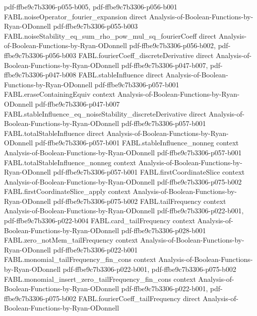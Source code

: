 \begin{theorem}
  {pdf-ffbe9c7b3306-p055-b005,
    pdf-ffbe9c7b3306-p056-b001}
\proofstep
  {FABL.noiseOperator_fourier_expansion}
  {direct}
  {Analysis-of-Boolean-Functions-by-Ryan-ODonnell}
  {pdf-ffbe9c7b3306-p055-b003}
\proofstep
  {FABL.noiseStability_eq_sum_rho_pow_mul_sq_fourierCoeff}
  {direct}
  {Analysis-of-Boolean-Functions-by-Ryan-ODonnell}
  {pdf-ffbe9c7b3306-p056-b002,
    pdf-ffbe9c7b3306-p056-b003}
\proofstep
  {FABL.fourierCoeff_discreteDerivative}
  {direct}
  {Analysis-of-Boolean-Functions-by-Ryan-ODonnell}
  {pdf-ffbe9c7b3306-p047-b007,
    pdf-ffbe9c7b3306-p047-b008}
\proofstep
  {FABL.stableInfluence}
  {direct}
  {Analysis-of-Boolean-Functions-by-Ryan-ODonnell}
  {pdf-ffbe9c7b3306-p057-b001}
\proofstep
  {FABL.eraseContainingEquiv}
  {context}
  {Analysis-of-Boolean-Functions-by-Ryan-ODonnell}
  {pdf-ffbe9c7b3306-p047-b007}
\proofstep
  {FABL.stableInfluence_eq_noiseStability_discreteDerivative}
  {direct}
  {Analysis-of-Boolean-Functions-by-Ryan-ODonnell}
  {pdf-ffbe9c7b3306-p057-b001}
\proofstep
  {FABL.totalStableInfluence}
  {direct}
  {Analysis-of-Boolean-Functions-by-Ryan-ODonnell}
  {pdf-ffbe9c7b3306-p057-b001}
\proofstep
  {FABL.stableInfluence_nonneg}
  {context}
  {Analysis-of-Boolean-Functions-by-Ryan-ODonnell}
  {pdf-ffbe9c7b3306-p057-b001}
\proofstep
  {FABL.totalStableInfluence_nonneg}
  {context}
  {Analysis-of-Boolean-Functions-by-Ryan-ODonnell}
  {pdf-ffbe9c7b3306-p057-b001}
\proofstep
  {FABL.firstCoordinateSlice}
  {context}
  {Analysis-of-Boolean-Functions-by-Ryan-ODonnell}
  {pdf-ffbe9c7b3306-p075-b002}
\proofstep
  {FABL.firstCoordinateSlice_apply}
  {context}
  {Analysis-of-Boolean-Functions-by-Ryan-ODonnell}
  {pdf-ffbe9c7b3306-p075-b002}
\proofstep
  {FABL.tailFrequency}
  {context}
  {Analysis-of-Boolean-Functions-by-Ryan-ODonnell}
  {pdf-ffbe9c7b3306-p022-b001,
    pdf-ffbe9c7b3306-p022-b004}
\proofstep
  {FABL.card_tailFrequency}
  {context}
  {Analysis-of-Boolean-Functions-by-Ryan-ODonnell}
  {pdf-ffbe9c7b3306-p028-b001}
\proofstep
  {FABL.zero_notMem_tailFrequency}
  {context}
  {Analysis-of-Boolean-Functions-by-Ryan-ODonnell}
  {pdf-ffbe9c7b3306-p022-b001}
\proofstep
  {FABL.monomial_tailFrequency_fin_cons}
  {context}
  {Analysis-of-Boolean-Functions-by-Ryan-ODonnell}
  {pdf-ffbe9c7b3306-p022-b001,
    pdf-ffbe9c7b3306-p075-b002}
\proofstep
  {FABL.monomial_insert_zero_tailFrequency_fin_cons}
  {context}
  {Analysis-of-Boolean-Functions-by-Ryan-ODonnell}
  {pdf-ffbe9c7b3306-p022-b001,
    pdf-ffbe9c7b3306-p075-b002}
\proofstep
  {FABL.fourierCoeff_tailFrequency}
  {direct}
  {Analysis-of-Boolean-Functions-by-Ryan-ODonnell}

\end{theorem}
